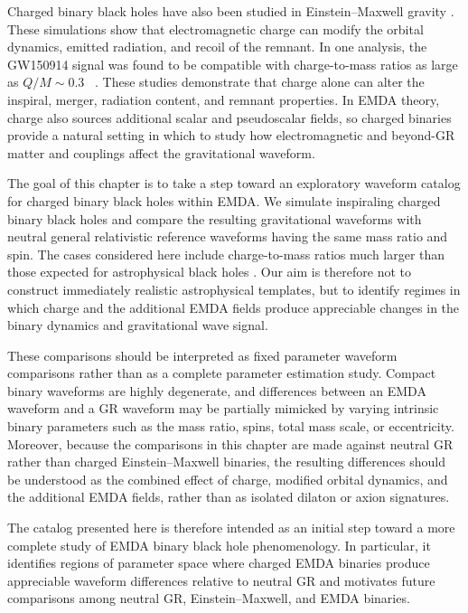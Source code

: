 Charged binary black holes have also been studied in Einstein--Maxwell gravity \cite{Bozzola2019,Zilhao2012,Zilhao2014,Bozzola2021,Bozzola2023ExtremalChargedMergers,Luna2022ChargedBBHKicks}. These simulations show that electromagnetic charge can modify the orbital dynamics, emitted radiation, and recoil of the remnant. In one analysis, the GW150914 signal was found to be compatible with charge-to-mass ratios as large as $Q/M\sim0.3$ ~\cite{Bozzola2021}. These studies demonstrate that charge alone can alter the inspiral, merger, radiation content, and remnant properties. In EMDA theory, charge also sources additional scalar and pseudoscalar fields, so charged binaries provide a natural setting in which to study how electromagnetic and beyond-GR matter and couplings affect the gravitational waveform.

The goal of this chapter is to take a step toward an exploratory waveform catalog for charged binary black holes within EMDA. We simulate inspiraling charged binary black holes and compare the resulting gravitational waveforms with neutral general relativistic reference waveforms having the same mass ratio and spin. The cases considered here include charge-to-mass ratios much larger than those expected for astrophysical black holes \cite{Gibbons1975VacuumPolarization,Pan2019BlackHoleDischarge}. Our aim is therefore not to construct immediately realistic astrophysical templates, but to identify regimes in which charge and the additional EMDA fields produce appreciable changes in the binary dynamics and gravitational wave signal.

These comparisons should be interpreted as fixed parameter waveform comparisons rather than as a complete parameter estimation study. Compact binary waveforms are highly degenerate, and differences between an EMDA waveform and a GR waveform may be partially mimicked by varying intrinsic binary parameters such as the mass ratio, spins, total mass scale, or eccentricity\cite{Hannam2013MassSpinDegeneracy,Vallisneri2013StealthBias}. Moreover, because the comparisons in this chapter are made against neutral GR rather than charged Einstein--Maxwell binaries, the resulting differences should be understood as the combined effect of charge, modified orbital dynamics, and the additional EMDA fields, rather than as isolated dilaton or axion signatures.

The catalog presented here is therefore intended as an initial step toward a more complete study of EMDA binary black hole phenomenology. In particular, it identifies regions of parameter space where charged EMDA binaries produce appreciable waveform differences relative to neutral GR and motivates future comparisons among neutral GR, Einstein--Maxwell, and EMDA binaries.

